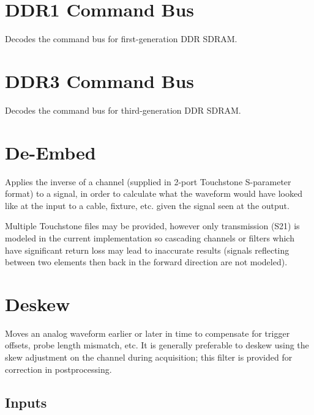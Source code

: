 \section{DDR1 Command Bus}

Decodes the command bus for first-generation DDR SDRAM.

\pagebreak
\section{DDR3 Command Bus}

Decodes the command bus for third-generation DDR SDRAM.

\pagebreak
\section{De-Embed}

Applies the inverse of a channel (supplied in 2-port Touchstone S-parameter format) to a signal, in order to calculate
what the waveform would have looked like at the input to a cable, fixture, etc. given the signal seen at the output.

Multiple Touchstone files may be provided, however only transmission (S21) is modeled in the current implementation so
cascading channels or filters which have significant return loss may lead to inaccurate results (signals reflecting
between two elements then back in the forward direction are not modeled).

\pagebreak
\section{Deskew}

Moves an analog waveform earlier or later in time to compensate for trigger offsets, probe length mismatch, etc.
It is generally preferable to deskew using the skew adjustment on the channel during acquisition; this filter is
provided for correction in postprocessing.

\subsection{Inputs}

